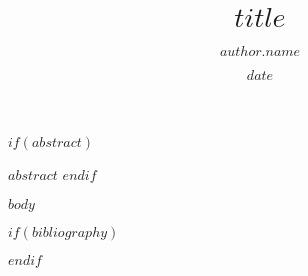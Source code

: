 \documentclass[11pt,a4paper]{article}
\title{$title$}
\author[$for(author.affil)$$author.affil$$sep$,$endfor$]{$author.name$}
\affil[$affiliation.num$]{$affiliation.org$}
\date{$date$}
\renewenvironment{abstract}
 {\small
  \begin{center}
  \bfseries \abstractname\vspace{-.5em}\vspace{0pt}
  \end{center}
  \list{}{
    \setlength{\leftmargin}{1.5cm}%
    \setlength{\rightmargin}{\leftmargin}%
  }%
  \item\relax}
 {\endlist}
\begin{document}
\maketitle

$if(abstract)$
\begin{abstract}
$abstract$
\end{abstract}
$endif$

$body$

$if(bibliography)$


$endif$
\end{document}
